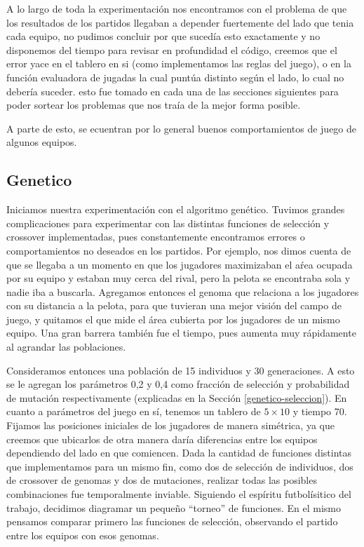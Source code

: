
A lo largo de toda la experimentación nos encontramos con el problema de que los resultados de los partidos llegaban a depender
fuertemente del lado que tenia cada equipo, no pudimos concluir por que sucedía esto exactamente y no disponemos del tiempo
para revisar en profundidad el código, creemos que el error yace en el tablero en si (como implementamos las reglas del juego),
 o en la función evaluadora de jugadas la cual puntúa distinto según el lado, lo cual no debería suceder.
 esto fue tomado en cada una de las secciones siguientes para poder sortear los problemas que nos traía de la mejor forma posible.


A parte de esto, se ecuentran por lo general buenos comportamientos de juego de algunos equipos.

\subsection{Genetico}


Iniciamos nuestra experimentación con el algoritmo genético.
Tuvimos grandes complicaciones para experimentar con las distintas funciones de selección y crossover implementadas, pues constantemente encontramos errores o comportamientos no deseados en los partidos.
Por ejemplo, nos dimos cuenta de que se llegaba a un momento en que los jugadores maximizaban el aŕea ocupada por su equipo y estaban muy cerca del rival, pero la pelota se encontraba sola y nadie iba a buscarla.
Agregamos entonces el genoma que relaciona a los jugadores con su distancia a la pelota, para que tuvieran una mejor visión del campo de juego, y quitamos el que mide el área cubierta por los jugadores de un mismo equipo.
Una gran barrera también fue el tiempo, pues aumenta muy rápidamente al agrandar las poblaciones.

Consideramos entonces una población de 15 individuos y 30 generaciones. A esto se le agregan los parámetros 0,2 y 0,4 como fracción de selección y probabilidad de mutación respectivamente (explicadas en la Sección \ref{genetico-seleccion}).
En cuanto a parámetros del juego en sí, tenemos un tablero de $5\times10$ y tiempo 70.
Fijamos las posiciones iniciales de los jugadores de manera simétrica, ya que creemos que ubicarlos de otra manera daría diferencias entre los equipos dependiendo del lado en que comiencen.
Dada la cantidad de funciones distintas que implementamos para un mismo fin, como dos de selección de individuos, dos de crossover de genomas y dos de mutaciones, realizar todas las posibles combinaciones fue temporalmente inviable. Siguiendo el espíritu futbolísitico del trabajo, decidimos diagramar un pequeño ``torneo'' de funciones. En el mismo pensamos comparar primero las funciones de selección, observando el partido entre los equipos con esos genomas.

